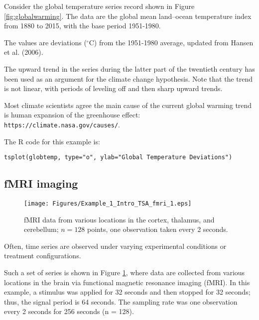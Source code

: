 \documentclass[
paper=128mm:96mm, %
fontsize=9.5pt, %
pagesize, %
parskip=half-, %
]{scrartcl} %
\theoremstyle{mythmstyle} %
\begin{document}
Consider the global temperature series record shown in Figure \ref{fig:globalwarming}. The data are the global mean land--ocean temperature index from 1880 to 2015, with the base period 1951-1980. 

The values are deviations ($^{\circ}$C) from the 1951-1980 average, updated from Hansen et al. (2006). 

The upward trend in the series during the latter part of the twentieth century has been used as an argument for the climate change hypothesis. Note that the trend is not linear, with periods of leveling off and then sharp upward trends. 

Most climate scientists agree the main cause of the current global warming trend is human expansion of the greenhouse effect: \texttt{https://climate.nasa.gov/causes/}. 

The R code for this example is:

\begin{lstlisting}[belowskip=-0.8 \baselineskip]
tsplot(globtemp, type="o", ylab="Global Temperature Deviations")
\end{lstlisting}
\clearpage




%
\subsection{fMRI imaging}
\begin{figure}[!h]
\begin{center}
%
\texttt{[image: Figures/Example\_1\_Intro\_TSA\_fmri\_1.eps]}
%
\caption{\footnotesize{fMRI data from various locations in the cortex, thalamus, and cerebellum; $n = 128$ points, one observation taken every 2 seconds.}}
%
\label{fig:fmri}
%
\end{center}
\end{figure}
%
\clearpage

Often, time series are observed under varying experimental conditions or treatment configurations. 

Such a set of series is shown in Figure \ref{fig:fmri}, where data are collected from various locations in the brain via functional magnetic resonance imaging (fMRI). In this example, a stimulus was applied for 32 seconds and then stopped for 32 seconds; thus, the signal period is 64 seconds. The sampling rate was one observation every 2 seconds for 256 seconds (n = 128). 
\end{document}
